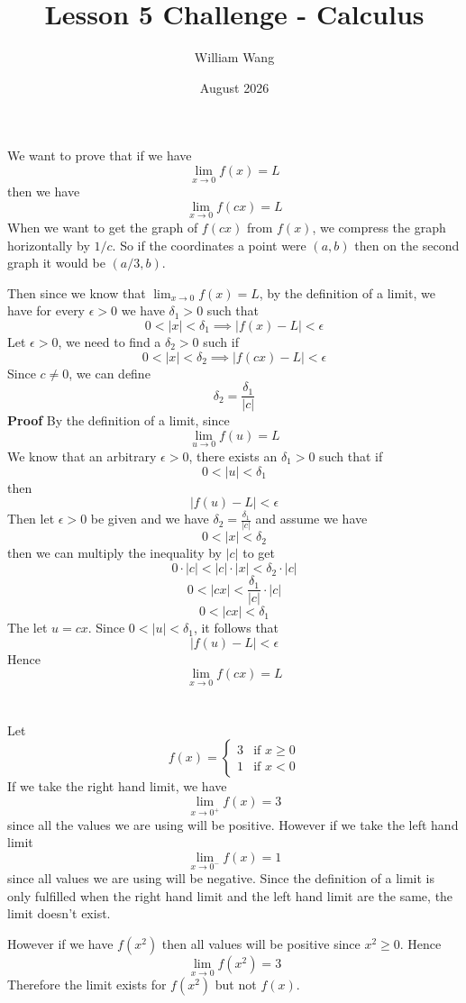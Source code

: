 \documentclass{article}
\title{Lesson 5 Challenge - Calculus}
\author{William Wang}
\date{August 2026}
\begin{document}
\maketitle

\section{}
We want to prove that if we have 
\[\lim_{x \to 0} f(x) = L\]
then we have 
\[\lim_{x \to 0} f(cx)  = L\]
When we want to get the graph of \(f(cx)\) from \(f(x)\), we compress the graph horizontally by \(1/c\). So if the coordinates a point were \((a,b)\) then on the second graph it would be \((a/3, b)\). 

Then since we know that \(\lim_{x\to 0} f(x) = L\), by the definition of a limit, we have for every \(\epsilon > 0\) we have \(\delta_1 >0\) such that 
\[0 < |x| < \delta_1 \implies |f(x) - L|  < \epsilon\]
Let \(\epsilon > 0\), we need to find a \(\delta_2 > 0\) such if 
\[0 < |x| < \delta_2 \implies |f(cx) - L| < \epsilon\] Since \(c \neq 0\), we can define 
\[\delta_2 = \frac{\delta_1}{|c|}\]
\textbf{Proof}
By the definition of a limit, since 
\[\lim_{u\to0}f(u) = L\]
We know that an arbitrary \(\epsilon > 0\), there exists an \(\delta_1 > 0\) such that if
\[0 < |u| < \delta_1\]
then 
\[|f(u)-L| < \epsilon\]
Then let \(\epsilon > 0\) be given and we have \(\delta_2 = \frac{\delta_1}{|c|}\) and assume we have
\[0 < |x| < \delta_2 \]
then we can multiply the inequality by \(|c|\) to get 
\[0\cdot|c| < |c| \cdot|x| < \delta_2 \cdot|c|\]
\[0 < |cx| < \frac{\delta_1}{|c|}\cdot |c|\]
\[0 < |cx| < \delta_1\]
The let \(u = cx\). Since \(0 < |u| < \delta_1\), it follows that 
\[|f(u) - L| < \epsilon\]
Hence 
\[\lim_{x\to0} f(cx) =L\]
\section{}
Let 
\[f(x) = \begin{cases}
    3 & \text{if } x \geq 0 \\
    1  & \text{if } x < 0
\end{cases}\]
If we take the right hand limit, we have 
\[\lim_{x\to0^+} f(x) =3\]
since all the values we are using will be positive. However if we take the left hand limit
\[\lim_{x\to 0^-} f(x) = 1\]
since all values we are using will be negative. Since the definition of a limit is only fulfilled when the right hand limit and the left hand limit are the same, the limit doesn't exist. 

However if we have \(f(x^2)\) then all values will be positive since \(x^2 \ge 0\). Hence 
\[\lim_{x\to 0} f(x^2) = 3\]
Therefore the limit exists for \(f(x^2)\) but not \(f(x)\). 
\end{document}
